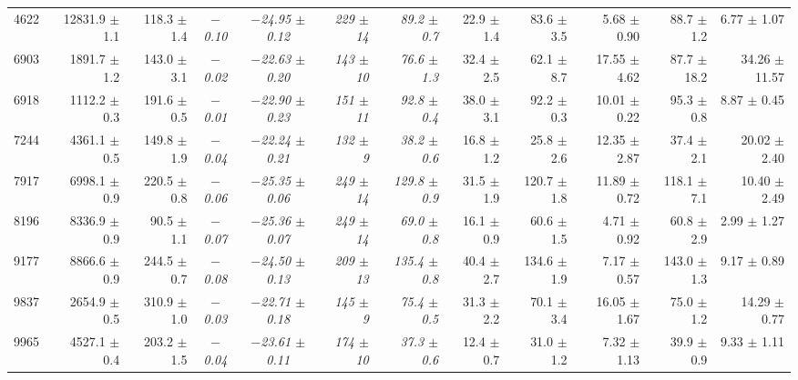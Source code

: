 \begin{table}
{\begin{tabular}{|rrrccrrrrrrr|}
  4622 & 12831.9 $\pm$ 1.1 & 118.3 $\pm$ 1.4 &{\it $-$0.10}&{\it $-$24.95 $\pm$ 0.12}&{\it 229 $\pm$           14}&{\it  89.2 $\pm$ 0.7}& 22.9 $\pm$ 1.4  &  83.6 $\pm$ 3.5 &  5.68 $\pm$ 0.90 &  88.7 $\pm$ \phantom{1}1.2 &  6.77 $\pm$ \phantom{1}1.07  \\
  6903 &  1891.7 $\pm$ 1.2 & 143.0 $\pm$ 3.1 &{\it $-$0.02}&{\it $-$22.63 $\pm$ 0.20}&{\it 143 $\pm$           10}&{\it  76.6 $\pm$ 1.3}& 32.4 $\pm$ 2.5  &  62.1 $\pm$ 8.7 & 17.55 $\pm$ 4.62 &  87.7 $\pm$           18.2 & 34.26 $\pm$           11.57  \\
  6918 &  1112.2 $\pm$ 0.3 & 191.6 $\pm$ 0.5 &{\it $-$0.01}&{\it $-$22.90 $\pm$ 0.23}&{\it 151 $\pm$           11}&{\it  92.8 $\pm$ 0.4}& 38.0 $\pm$ 3.1  &  92.2 $\pm$ 0.3 & 10.01 $\pm$ 0.22 &  95.3 $\pm$ \phantom{1}0.8 &  8.87 $\pm$ \phantom{1}0.45  \\
  7244 &  4361.1 $\pm$ 0.5 & 149.8 $\pm$ 1.9 &{\it $-$0.04}&{\it $-$22.24 $\pm$ 0.21}&{\it 132 $\pm$ \phantom{1}9}&{\it  38.2 $\pm$ 0.6}& 16.8 $\pm$ 1.2  &  25.8 $\pm$ 2.6 & 12.35 $\pm$ 2.87 &  37.4 $\pm$ \phantom{1}2.1 & 20.02 $\pm$ \phantom{1}2.40  \\
  7917 &  6998.1 $\pm$ 0.9 & 220.5 $\pm$ 0.8 &{\it $-$0.06}&{\it $-$25.35 $\pm$ 0.06}&{\it 249 $\pm$           14}&{\it 129.8 $\pm$ 0.9}& 31.5 $\pm$ 1.9  & 120.7 $\pm$ 1.8 & 11.89 $\pm$ 0.72 & 118.1 $\pm$ \phantom{1}7.1 & 10.40 $\pm$ \phantom{1}2.49  \\
  8196 &  8336.9 $\pm$ 0.9 &  90.5 $\pm$ 1.1 &{\it $-$0.07}&{\it $-$25.36 $\pm$ 0.07}&{\it 249 $\pm$           14}&{\it  69.0 $\pm$ 0.8}& 16.1 $\pm$ 0.9  &  60.6 $\pm$ 1.5 &  4.71 $\pm$ 0.92 &  60.8 $\pm$ \phantom{1}2.9 &  2.99 $\pm$ \phantom{1}1.27  \\
  9177 &  8866.6 $\pm$ 0.9 & 244.5 $\pm$ 0.7 &{\it $-$0.08}&{\it $-$24.50 $\pm$ 0.13}&{\it 209 $\pm$           13}&{\it 135.4 $\pm$ 0.8}& 40.4 $\pm$ 2.7  & 134.6 $\pm$ 1.9 &  7.17 $\pm$ 0.57 & 143.0 $\pm$ \phantom{1}1.3 &  9.17 $\pm$ \phantom{1}0.89  \\
  9837 &  2654.9 $\pm$ 0.5 & 310.9 $\pm$ 1.0 &{\it $-$0.03}&{\it $-$22.71 $\pm$ 0.18}&{\it 145 $\pm$ \phantom{1}9}&{\it  75.4 $\pm$ 0.5}& 31.3 $\pm$ 2.2  &  70.1 $\pm$ 3.4 & 16.05 $\pm$ 1.67 &  75.0 $\pm$ \phantom{1}1.2 & 14.29 $\pm$ \phantom{1}0.77  \\
  9965 &  4527.1 $\pm$ 0.4 & 203.2 $\pm$ 1.5 &{\it $-$0.04}&{\it $-$23.61 $\pm$ 0.11}&{\it 174 $\pm$           10}&{\it  37.3 $\pm$ 0.6}& 12.4 $\pm$ 0.7  &  31.0 $\pm$ 1.2 &  7.32 $\pm$ 1.13 &  39.9 $\pm$ \phantom{1}0.9 &  9.33 $\pm$ \phantom{1}1.11  \\

\end{tabular}}
\end{table}
